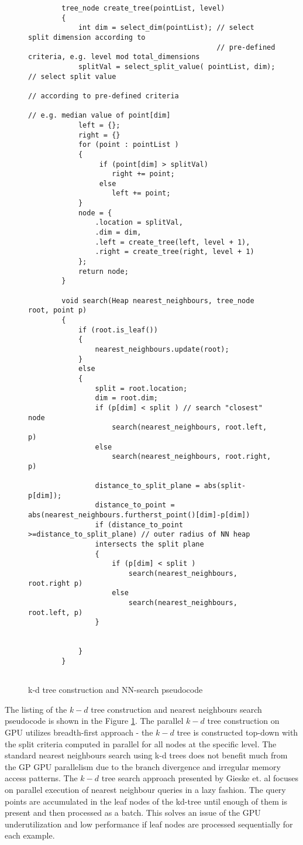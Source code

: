  \begin{figure}[htp]
 	\begin{lstlisting}
		tree_node create_tree(pointList, level)
		{
			int dim = select_dim(pointList); // select split dimension according to 
											 // pre-defined criteria, e.g. level mod total_dimensions
			splitVal = select_split_value( pointList, dim); // select split value
															// according to pre-defined criteria
															// e.g. median value of point[dim]
			left = {};
			right = {}
			for (point : pointList ) 
			{
			     if (point[dim] > splitVal) 
			        right += point;
			     else
			     	left += point;
			}
			node = {
				.location = splitVal,
				.dim = dim,
				.left = create_tree(left, level + 1),
				.right = create_tree(right, level + 1) 
			};
			return node;
		}
		
		void search(Heap nearest_neighbours, tree_node root, point p) 
		{
			if (root.is_leaf()) 
			{
				nearest_neighbours.update(root);
			}
			else
			{
				split = root.location;
				dim = root.dim;
				if (p[dim] < split ) // search "closest" node
					search(nearest_neighbours, root.left, p) 
				else
					search(nearest_neighbours, root.right, p)
					
				distance_to_split_plane = abs(split-p[dim]); 
				distance_to_point = abs(nearest_neighbours.furtherst_point()[dim]-p[dim]) 
				if (distance_to_point >=distance_to_split_plane) // outer radius of NN heap
				intersects the split plane
				{
					if (p[dim] < split ) 
						search(nearest_neighbours, root.right p) 
					else
						search(nearest_neighbours, root.left, p)
				}
					
				
			}
		}
		
	\end{lstlisting}
	\caption{\label{k-d tree pseudocode} k-d tree construction and NN-search
	pseudocode}
\end{figure}
The listing of the $ k-d $ tree construction and nearest neighbours search
pseudocode is shown in the Figure \ref{k-d tree pseudocode}.
The parallel $ k-d $ tree construction on GPU utilizes breadth-first
approach\cite{Zhou}\cite{Shevtsov_highlyparallel} - the $ k-d $ tree is
constructed top-down with the split criteria computed in parallel for all nodes
at the specific level.
The standard nearest neighbours search using k-d trees does not benefit much
from the GP GPU parallelism due to the branch divergence and irregular memory access
patterns\cite{gieseke2014buffer}. The $ k-d $ tree search approach presented by
Gieske et. al focuses on parallel execution of nearest neighbour queries in a
lazy fashion. The query points are accumulated in the leaf nodes of the kd-tree until enough of them is present and then processed as a batch. This solves an issue of the GPU underutilization and low performance if leaf nodes are processed sequentially for each example\cite{gieseke2014buffer}.

